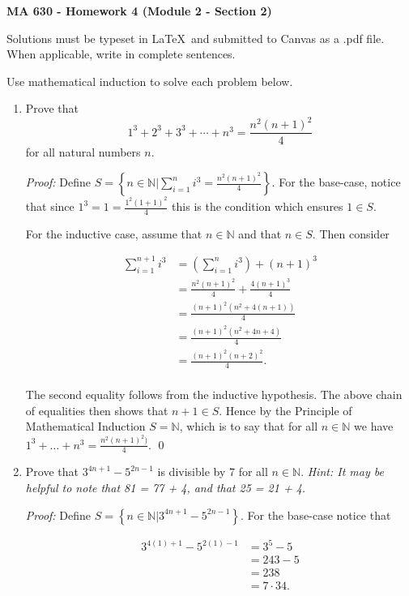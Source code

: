 \documentclass[12pt]{article}
\begin{document}
\pagestyle{empty}

 {\noindent \textbf{\large MA 630 - Homework 4 (Module 2 - Section 2)}
\vspace{.25in}

\noindent Solutions must be typeset in \LaTeX \ and submitted to Canvas as a .pdf file. When applicable, write in complete sentences.
\vspace{.25in}

Use mathematical induction to solve each problem below.

\begin{enumerate}


\item Prove that
\[1^3 + 2^3 + 3^3 + \dotsb + n^3 = \frac{n^2(n+1)^2}{4}\]
for all natural numbers $n$.

{\it Proof:} Define $S=\left\{n\in \mathbb N| \sum_{i=1}^n i^3 = \frac{n^2(n+1)^2}{4}\right\}.$  For the base-case, notice that since $1^3 = 1 = \frac{1^2(1+1)^2}{4}$ this is the condition which ensures $1\in S$.

For the inductive case, assume that $n\in\mathbb{N}$ and that $n\in S$.  Then consider

\begin{align*}
  \sum_{i=1}^{n+1} i^3 &= \left(\sum_{i=1}^n i^3\right)+(n+1)^3 \\[.3cm]
  &= \frac{n^2(n+1)^2}{4} + \frac{4(n+1)^3}{4} \\[.3cm]
  &= \frac{(n+1)^2(n^2+4(n+1))}{4} \\[.3cm]
  &= \frac{(n+1)^2(n^2+4n+4)}{4} \\[.3cm]
  &= \frac{(n+1)^2(n+2)^2}{4}. \\
\end{align*}

The second equality follows from the inductive hypothesis.  The above chain of equalities then shows that $n+1\in S$.  Hence by the Principle of Mathematical Induction $S=\mathbb N$, which is to say that for all $n\in \mathbb N$ we have $1^3+\dots+n^3 = \frac{n^2(n+1)^2)}{4}$. \qed

\item Prove that $3^{4n+1} - 5^{2n-1}$ is divisible by 7 for all $n \in \mathbb{N}$. \emph{Hint: It may be helpful to note that 81 = 77 + 4, and that 25 = 21 + 4.}

{\it Proof:} Define $S=\left\{n\in\mathbb{N}|3^{4n+1}-5^{2n-1}\right\}$.  For the base-case notice that

  \begin{align*}
    3^{4(1)+1}-5^{2(1)-1} &= 3^5-5 \\
    &= 243-5 \\
    &=238 \\
    &= 7\cdot 34.\\
  \end{align*}


\end{enumerate}}
\end{document}
